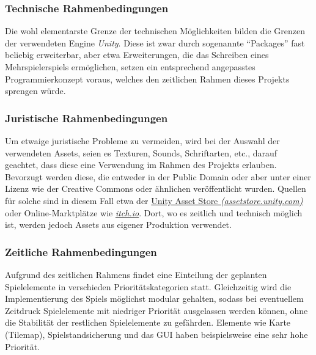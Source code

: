 \documentclass[paper=A4,pagesize=auto,12pt,headinclude=true,footinclude=true,BCOR=0mm,DIV=calc]{scrartcl}
\begin{document}
\subsubsection{Technische Rahmenbedingungen}
Die wohl elementarste Grenze der technischen Möglichkeiten bilden die Grenzen der verwendeten Engine \textit{Unity}. Diese ist zwar durch sogenannte "`Packages"' fast beliebig erweiterbar, aber etwa Erweiterungen, die das Schreiben eines Mehrspielerspiels ermöglichen, setzen ein entsprechend angepasstes Programmierkonzept voraus, welches den zeitlichen Rahmen dieses Projekts sprengen würde.

\subsubsection{Juristische Rahmenbedingungen}
Um etwaige juristische Probleme zu vermeiden, wird bei der Auswahl der verwendeten Assets, seien es Texturen, Sounds, Schriftarten, etc., darauf geachtet, dass diese eine Verwendung im Rahmen des Projekts erlauben. Bevorzugt werden diese, die entweder in der Public Domain oder aber unter einer Lizenz wie der Creative Commons \cite{cc_licenses} oder ähnlichen veröffentlicht wurden. Quellen für solche sind in diesem Fall etwa der \hyperref{https://assetstore.unity.com/}{}{}{Unity Asset Store \textit{(assetstore.unity.com)}} oder Online-Marktplätze wie \hyperref{https://itch.io/}{}{}{\textit{itch.io}}. Dort, wo es zeitlich und technisch möglich ist, werden jedoch Assets aus eigener Produktion verwendet.

\subsubsection{Zeitliche Rahmenbedingungen}
Aufgrund des zeitlichen Rahmens findet eine Einteilung der geplanten Spielelemente in verschieden Prioritätskategorien statt. Gleichzeitig wird die Implementierung des Spiels möglichst modular gehalten, sodass bei eventuellem Zeitdruck Spielelemente mit niedriger Priorität ausgelassen werden können, ohne die Stabilität der restlichen Spielelemente zu gefährden. Elemente wie Karte (Tilemap), Spielstandsicherung und das GUI haben beispielsweise eine sehr hohe Priorität.

\newpage
\end{document}
